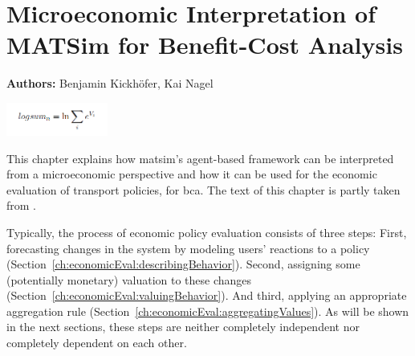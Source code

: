 \chapter{Microeconomic Interpretation of MATSim for Benefit-Cost Analysis}
\label{ch:economicEval}

\hfill \textbf{Authors:} Benjamin Kickhöfer, Kai Nagel

\begin{center} \includegraphics[width=0.25\textwidth, angle=0]{understanding/figures/logsum} \end{center}


This chapter explains how \acrshort{matsim}'s agent-based framework can be interpreted from a micro\-economic perspective and how it can be used for the economic evaluation of transport policies, \eg for \gls{bca}. The text of this chapter is partly taken from \citet[][Section~2.3]{Kickhoefer_PhDThesis_2014}.

Typically, the process of economic policy evaluation consists of three steps:
%
First, forecasting changes in the system by modeling users' reactions to a policy
(Section~\ref{ch:economicEval:describingBehavior}).
%
Second, assigning some (potentially monetary) valuation to these changes (Section~\ref{ch:economicEval:valuingBehavior}).
%
And third, applying an appropriate aggregation rule (Section~\ref{ch:economicEval:aggregatingValues}).
%
As will be shown in the next sections, these steps are neither completely independent nor completely dependent on each other.

